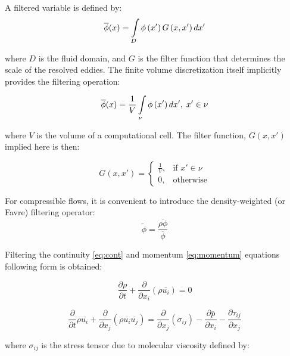 A filtered variable is defined by:
\begin{equation} \label{eq:lesfilter}
\overline{\phi}(x) = \int\displaylimits_{D} \phi \left( x' \right) G \left( x, x' \right) dx'
\end{equation}

\noindent where $D$ is the fluid domain, and $G$ is the filter function that determines the scale of the resolved eddies. The finite volume discretization itself implicitly provides the filtering operation:

\begin{equation} \label{eq:lesfilter2}
\overline{\phi}(x) = \frac{1}{V} \int\displaylimits_{\nu} \phi \left( x' \right) dx', \; x' \in \nu
\end{equation}

\noindent where $V$ is the volume of a computational cell. The filter function, $G(x, x')$ implied here is then:

\begin{equation} \label{eq:lesfilter3}
G(x, x') = 
\begin{cases}
	\frac{1}{V}, & \text{if } x'\in \nu \\
	0, & \text{otherwise}
\end{cases}
\end{equation}

For compressible flows, it is convenient to introduce the density-weighted (or Favre) filtering operator:
\begin{equation} \label{eq:favre}
\tilde{\phi} = \frac{\overline{\rho \phi}}{\overline{\phi}}
\end{equation}

Filtering the continuity \ref{eq:cont} and momentum \ref{eq:momentum} equations following form is obtained:

\begin{equation} \label{eq:lescont}
\frac{\partial \rho}{\partial t} + \frac{\partial}{\partial x_i} \left( \rho \overline{u_i} \right) = 0
\end{equation}

\begin{equation} \label{eq:lesmom}
\frac{\partial}{\partial t} \rho \overline{u_i}
+ \frac{\partial}{\partial x_j} \left( \rho \overline{u_i} \overline{u_j} \right)
= \frac{\partial}{\partial x_j} \left( \sigma_{ij} \right)
- \frac{\partial \overline{p}}{\partial x_i}
- \frac{\partial \tau_{ij}}{\partial x_j}
\end{equation}

\noindent where $\sigma_{ij}$ is the stress tensor due to molecular viscosity defined by:

